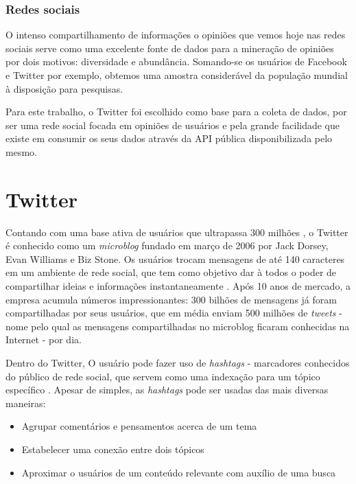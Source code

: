\subsubsection{Redes sociais}

O intenso compartilhamento de informações o opiniões que vemos hoje nas redes sociais serve como uma excelente fonte de dados para a mineração de opiniões por dois motivos: diversidade e abundância. Somando-se os usuários de Facebook e Twitter por exemplo, obtemos uma amostra considerável da população mundial à disposição para pesquisas.

Para este trabalho, o Twitter foi escolhido como base para a coleta de dados, por ser uma rede social focada em opiniões de usuários e pela grande facilidade que existe em consumir os seus dados através da API pública disponibilizada pelo mesmo.

\section{Twitter}\label{sec:twitter}

Contando com uma base ativa de usuários que ultrapassa 300 milhões \cite{twittercompany2016}, o Twitter é conhecido como um \emph{microblog} fundado em março de 2006 por Jack Dorsey, Evan Williams e Biz Stone. Os usuários trocam mensagens de até 140 caracteres \cite{twittercharlimit2016} em um ambiente de rede social, que tem como objetivo dar à todos o poder de compartilhar ideias e informações instantaneamente \cite{twittercompany2016}. Após 10 anos de mercado, a empresa acumula números impressionantes: 300 bilhões de mensagens já foram compartilhadas por seus usuários, que em média enviam 500 milhões de \emph{tweets} \cite{twitterstats2016} - nome pelo qual as mensagens compartilhadas no microblog ficaram conhecidas na Internet - por dia.

Dentro do Twitter, O usuário pode fazer uso de \emph{hashtags} - marcadores conhecidos do público de rede social, que servem como uma indexação para um tópico específico \cite{waite2012paperback}. Apesar de simples, as \emph{hashtags} pode ser usadas das mais diversas maneiras:
\begin{itemize}
\item Agrupar comentários e pensamentos acerca de um tema
\item Estabelecer uma conexão entre dois tópicos
\item Aproximar o usuários de um conteúdo relevante com auxílio de uma busca
\end{itemize}

